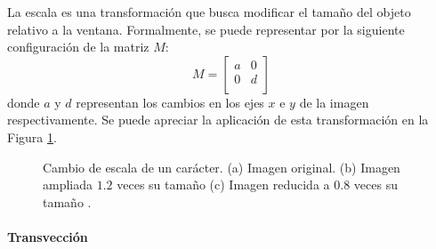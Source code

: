 			La escala es una transformación que busca modificar el tamaño del objeto relativo a la ventana. Formalmente, se puede representar por la siguiente configuración de la matriz $M$:
			\begin{equation}
				M = 
				\begin{bmatrix}
					a & 0 \\
					0 & d \\
				\end{bmatrix}
			\end{equation}
		donde $a$ y $d$ representan los cambios en los ejes $x$ e $y$ de la imagen respectivamente. Se puede apreciar la aplicación de esta transformación en la Figura \ref{fig: Transformacion Afin - Escala}.
		\begin{figure}[htbp]
			\centering
			\caption[Cambio de escala de un carácter]{Cambio de escala de un carácter. (a) Imagen original. (b) Imagen ampliada $1.2$ veces su tamaño  (c) Imagen reducida a $0.8$ veces su tamaño .}
			\label{fig: Transformacion Afin - Escala}
		\end{figure}	
			
		\paragraph{Transvección}
		
